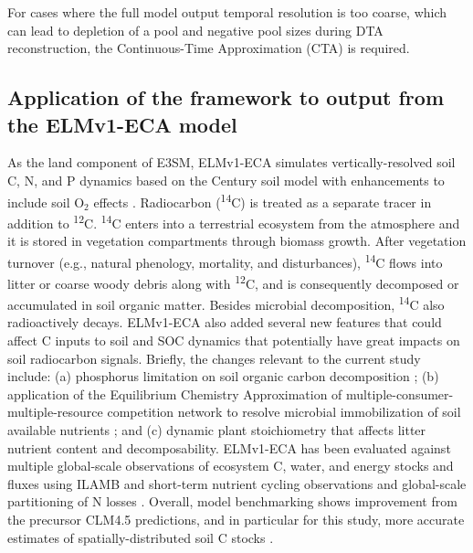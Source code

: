 \documentclass[draft]{agujournal2019}
\begin{document}
    For cases where the full model output temporal resolution is too coarse, which can lead to depletion of a pool and negative pool sizes during DTA reconstruction, the Continuous-Time Approximation (CTA) is required.

\subsection{Application of the framework to output from the ELMv1-ECA model}
   
    As the land component of E3SM, ELMv1-ECA \cite{Riley2018, Zhu2019} simulates vertically-resolved soil C, N, and P dynamics based on the Century soil model \cite{Parton1993} with enhancements  to include soil O$_2$ effects \cite{Koven2013}. Radiocarbon (\textsuperscript{14}C) is treated as a separate tracer in addition to \textsuperscript{12}C. \textsuperscript{14}C enters into a terrestrial ecosystem from the atmosphere \cite{Graven2017} and it is stored in vegetation compartments through biomass growth. After vegetation turnover (e.g., natural phenology, mortality, and disturbances), \textsuperscript{14}C flows into litter or coarse woody debris  along with \textsuperscript{12}C, and is consequently decomposed or accumulated in soil organic matter. Besides microbial decomposition, \textsuperscript{14}C also radioactively decays. ELMv1-ECA also added several new features that could affect C inputs to soil and SOC dynamics that potentially have great impacts on soil radiocarbon signals. Briefly, the changes relevant to the current study include: (a) phosphorus limitation on soil organic carbon decomposition \cite{zhu2016bg}; (b) application of the Equilibrium Chemistry Approximation of multiple-consumer-multiple-resource competition network to resolve microbial immobilization of soil available nutrients \cite{Tang2013, Zhu2017ea}; and (c) dynamic plant stoichiometry that affects litter nutrient content and decomposability. ELMv1-ECA has been evaluated against multiple global-scale observations of ecosystem C, water, and energy stocks and fluxes using ILAMB \cite{Collier2018, Zhu2019} and short-term nutrient cycling observations and global-scale partitioning of N losses \cite{Zhu2015ncc, Riley2018}. Overall, model benchmarking shows improvement from the precursor CLM4.5 predictions, and in particular for this study, more accurate estimates of spatially-distributed soil C stocks \cite{Zhu2019}.
    
\end{document}
